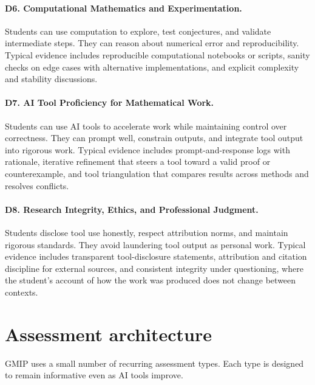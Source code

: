 \documentclass{SIAMbook2023}
\begin{document}
\paragraph{D6. Computational Mathematics and Experimentation.}
Students can use computation to explore, test conjectures, and validate intermediate steps. They can reason about numerical error and reproducibility. Typical evidence includes reproducible computational notebooks or scripts, sanity checks on edge cases with alternative implementations, and explicit complexity and stability discussions.

\paragraph{D7. AI Tool Proficiency for Mathematical Work.}
Students can use AI tools to accelerate work while maintaining control over correctness. They can prompt well, constrain outputs, and integrate tool output into rigorous work. Typical evidence includes prompt-and-response logs with rationale, iterative refinement that steers a tool toward a valid proof or counterexample, and tool triangulation that compares results across methods and resolves conflicts.

\paragraph{D8. Research Integrity, Ethics, and Professional Judgment.}
Students disclose tool use honestly, respect attribution norms, and maintain rigorous standards. They avoid laundering tool output as personal work. Typical evidence includes transparent tool-disclosure statements, attribution and citation discipline for external sources, and consistent integrity under questioning, where the student's account of how the work was produced does not change between contexts.

\section{Assessment architecture}

GMIP uses a small number of recurring assessment types. Each type is designed to remain informative even as AI tools improve.
\end{document}
